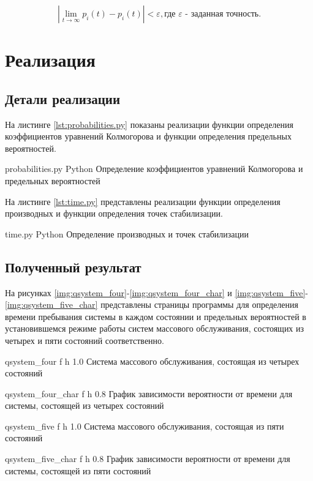 \begin{equation}
	|\lim_{t \to \infty}p_{i}(t) - p_{i}(t)| < \varepsilon, \text{где } \varepsilon \text{ - заданная точность.}
\end{equation} 

\chapter{Реализация}

\section{Детали реализации}

На листинге \ref{lst:probabilities.py} показаны реализации функции определения коэффициентов уравнений Колмогорова и функции определения предельных вероятностей.

    {probabilities.py}
    {Python}
    {Определение коэффициентов уравнений Колмогорова и предельных вероятностей}
    
На листинге \ref{lst:time.py} представлены реализации функции определения производных и функции определения точек стабилизации.

    {time.py}
    {Python}
    {Определение производных и точек стабилизации}

\section{Полученный результат}

На рисунках \ref{img:qsystem_four}-\ref{img:qsystem_four_char} и \ref{img:qsystem_five}-\ref{img:qsystem_five_char} представлены страницы программы для определения времени пребывания системы в каждом состоянии и предельных вероятностей в установившемся режиме работы систем массового обслуживания, состоящих из четырех и пяти состояний соответственно.

    {qsystem_four}
    {f}
    {h}
    {1.0\textwidth}
    {Система массового обслуживания, состоящая из четырех состояний}
    
    {qsystem_four_char}
    {f}
    {h}
    {0.8\textwidth}
    {График зависимости вероятности от времени для системы, состоящей из четырех состояний}
    
    {qsystem_five}
    {f}
    {h}
    {1.0\textwidth}
    {Система массового обслуживания, состоящая из пяти состояний}
    
    {qsystem_five_char}
    {f}
    {h}
    {0.8\textwidth}
    {График зависимости вероятности от времени для системы, состоящей из пяти состояний}
